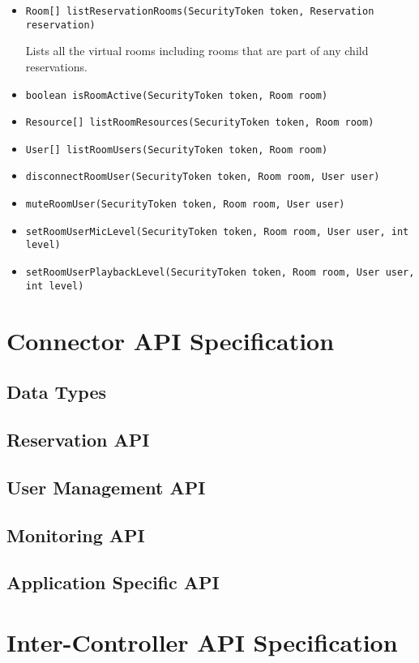 \documentclass[a4paper]{report}
\newcommand{\APIcmd}[1]{%
\item \lstinline[style=myinline]!#1!%

}
\newenvironment{APIdef}{\begin{itemize}}{\end{itemize}}
\begin{document}
\begin{APIdef}

\APIcmd{Room[] listReservationRooms(SecurityToken token, Reservation reservation)}

Lists all the virtual rooms including rooms that are part of any child reservations.

\APIcmd{boolean isRoomActive(SecurityToken token, Room room)}

\APIcmd{Resource[] listRoomResources(SecurityToken token, Room room)}

\APIcmd{User[] listRoomUsers(SecurityToken token, Room room)}

\APIcmd{disconnectRoomUser(SecurityToken token, Room room, User user)}

\APIcmd{muteRoomUser(SecurityToken token, Room room, User user)}

\APIcmd{setRoomUserMicLevel(SecurityToken token, Room room, User user, int level)}

\APIcmd{setRoomUserPlaybackLevel(SecurityToken token, Room room, User user, int level)}

\end{APIdef}


\chapter{Connector API Specification}

\section{Data Types}

\section{Reservation API}

\section{User Management API}

\section{Monitoring API}

\section{Application Specific API}




\chapter{Inter-Controller API Specification}
\end{document}
